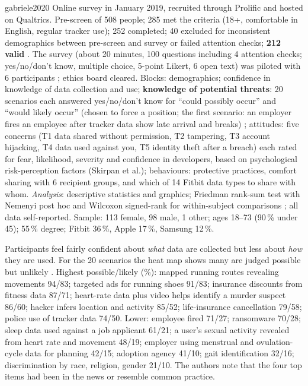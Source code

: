 \begin{papercard}{gabriele2020}
 Online survey in January 2019, recruited through Prolific and hosted on Qualtrics. Pre-screen of 508 people; 285 met the criteria (18+, comfortable in English, regular tracker use); 252 completed; 40 excluded for inconsistent demographics between pre-screen and survey or failed attention checks; \textbf{212 valid} . The survey (about 20 minutes, 100 questions including 4 attention checks; yes/no/don't know, multiple choice, 5-point Likert, 6 open text) was piloted with 6 participants ; ethics board cleared. Blocks: demographics; confidence in knowledge of data collection and use; \textbf{knowledge of potential threats}: 20 scenarios each answered yes/no/don't know for ``could possibly occur'' and ``would likely occur'' (chosen to force a position; the first scenario: an employer fires an employee after tracker data show late arrival and breaks) ; attitudes: five concerns (T1 data shared without permission, T2 tampering, T3 account hijacking, T4 data used against you, T5 identity theft after a breach) each rated for fear, likelihood, severity and confidence in developers, based on psychological risk-perception factors (Skirpan et al.); behaviours: protective practices, comfort sharing with 6 recipient groups, and which of 14 Fitbit data types to share with whom. \emph{Analysis}: descriptive statistics and graphics; Friedman rank-sum test with Nemenyi post hoc and Wilcoxon signed-rank for within-subject comparisons ; all data self-reported. Sample: 113 female, 98 male, 1 other; ages 18--73 (90\,\% under 45); 55\,\% degree; Fitbit 36\,\%, Apple 17\,\%, Samsung 12\,\%.

 Participants feel fairly confident about \emph{what} data are collected but less about \emph{how} they are used. For the 20 scenarios the heat map shows many are judged possible but unlikely . Highest possible/likely (\%): mapped running routes revealing movements 94/83; targeted ads for running shoes 91/83; insurance discounts from fitness data 87/71; heart-rate data plus video helps identify a murder suspect 86/60; hacker infers location and activity 85/52; life-insurance cancellation 79/58; police use of tracker data 74/50. Lower: employee fired 71/27; ransomware 70/28; sleep data used against a job applicant 61/21; a user's sexual activity revealed from heart rate and movement 48/19; employer using menstrual and ovulation-cycle data for planning 42/15; adoption agency 41/10; gait identification 32/16; discrimination by race, religion, gender 21/10. The authors note that the four top items had been in the news or resemble common practice.


\end{papercard}
